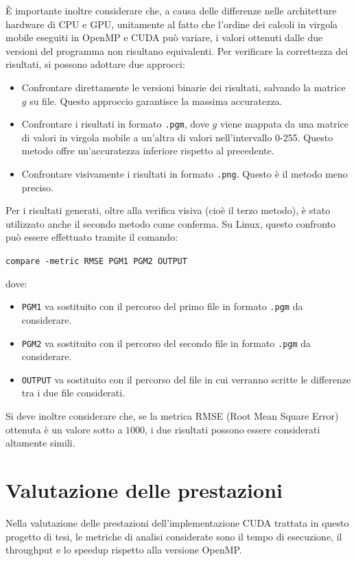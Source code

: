 \documentclass[12pt,a4paper]{report}
\begin{document}
È importante inoltre considerare che, a causa delle differenze nelle architetture hardware di CPU e GPU, unitamente al fatto che
l'ordine dei calcoli in virgola mobile eseguiti in OpenMP e CUDA può variare, i valori ottenuti dalle due versioni del
programma non risultano equivalenti.
Per verificare la correttezza dei risultati, si possono adottare due approcci:
\begin{itemize}
  \item Confrontare direttamente le versioni binarie dei risultati, salvando la matrice \(g\) su file.
        Questo approccio garantisce la massima accuratezza.
  \item Confrontare i risultati in formato \lstinline{.pgm}, dove \(g\) viene mappata da una matrice di valori in virgola mobile a
        un'altra di valori nell'intervallo 0-255.
        Questo metodo offre un'accuratezza inferiore rispetto al precedente.
  \item Confrontare visivamente i risultati in formato \lstinline{.png}.
        Questo è il metodo meno preciso.
\end{itemize}
Per i risultati generati, oltre alla verifica visiva (cioè il terzo metodo), è stato utilizzato anche il secondo metodo come
conferma.
Su Linux, questo confronto può essere effettuato tramite il comando:

\lstinline{compare -metric RMSE PGM1 PGM2 OUTPUT}

dove:
\begin{itemize}
  \item \lstinline{PGM1} va sostituito con il percorso del primo file in formato \lstinline{.pgm} da considerare.
  \item \lstinline{PGM2} va sostituito con il percorso del secondo file in formato \lstinline{.pgm} da considerare.
  \item \lstinline{OUTPUT} va sostituito con il percorso del file in cui verranno scritte le differenze tra i due file
        considerati.
\end{itemize}

Si deve inoltre considerare che, se la metrica RMSE (Root Mean Square Error) ottenuta è un valore sotto a \(1000\), i due
risultati possono essere considerati altamente simili.

\chapter{Valutazione delle prestazioni} \label{chap:perf}

Nella valutazione delle prestazioni dell'implementazione CUDA trattata in questo progetto di tesi, le metriche di analisi
considerate sono il tempo di esecuzione, il throughput e lo speedup rispetto alla versione OpenMP.
\end{document}
